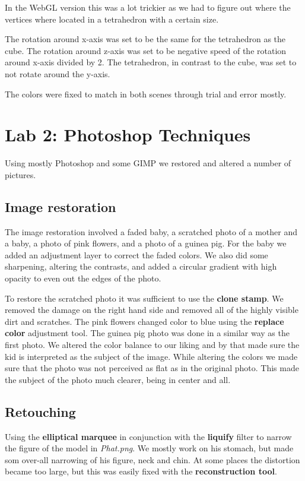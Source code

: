 \documentclass[a4paper]{article}
\begin{document}
In the WebGL version this was a lot trickier as we had to figure out where the
vertices where located in a tetrahedron with a certain size.

The rotation around x-axis was set to be the same for the tetrahedron as the
cube. The rotation around z-axis was set to be negative speed of the rotation
around x-axis divided by 2. The tetrahedron, in contrast to the cube, was set to
not rotate around the y-axis.

The colors were fixed to match in both scenes through trial and error mostly.
\newpage
\section{Lab 2: Photoshop Techniques}
Using mostly Photoshop and some GIMP we restored and altered a number of pictures.

\subsection{Image restoration} %
The image restoration involved a faded baby, a scratched photo of a mother and a
baby, a photo of pink flowers, and a photo of a guinea pig. For the baby we
added an adjustment layer to correct the faded colors. We also did some
sharpening, altering the contrasts, and added a circular gradient with high
opacity to even out the edges of the photo.

To restore the scratched photo it was sufficient to use the \textbf{clone
stamp}. We removed the damage on the right hand side and removed all of the
highly visible dirt and scratches. The pink flowers changed color to blue using
the \textbf{replace color} adjustment tool. The guinea pig photo was done in a
similar way as the first photo. We altered the color balance to our liking and
by that made sure the kid is interpreted as the subject of the image. While
altering the colors we made sure that the photo was not perceived as flat as in
the original photo. This made the subject of the photo much clearer, being in
center and all.

\subsection{Retouching} %
Using the \textbf{elliptical marquee} in conjunction with the \textbf{liquify}
filter to narrow the figure of the model in \textit{Phat.png}. We mostly work on
his stomach, but made som over-all narrowing of his figure, neck and chin. At
some places the distortion became too large, but this was easily fixed with the
\textbf{reconstruction tool}.
\end{document}

